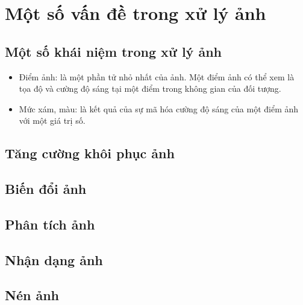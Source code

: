 \documentclass[12pt,oneside,a4]{report}
\begin{document}
\section{Một số vấn đề trong xử lý ảnh}
\subsection{Một số khái niệm trong xử lý ảnh}
\begin{itemize}
\item Điểm ảnh: là một phần tử nhỏ nhất của ảnh. Một điểm ảnh có thể xem là tọa độ và cường độ sáng tại một điểm trong không gian của đối tượng. 
\item Mức xám, màu: là kết quả của sự mã hóa cường độ sáng của một điểm ảnh với một giá trị số.
\end{itemize}
\subsection{Tăng cường khôi phục ảnh}
\subsection{Biến đổi ảnh}
\subsection{Phân tích ảnh}
\subsection{Nhận dạng ảnh}
\subsection{Nén ảnh}

%
\end{document}
